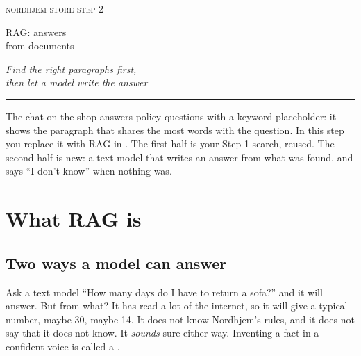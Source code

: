 \documentclass[11pt]{article}
\begin{document}
\thispagestyle{empty}
\setlength{\parindent}{0pt}
\vspace*{1.2cm}
{\color{muted}\scshape\MakeLowercase{Nordhjem store}
  \textperiodcentered{} \MakeLowercase{Step 2}}\par
\vspace{0.9cm}
{\fontsize{28}{32}\selectfont RAG: answers\\[2pt] from documents\par}
\vspace{0.5cm}
{\large\itshape\color{muted} Find the right paragraphs first,\\
  then let a model write the answer\par}
\vspace{0.6cm}
{\color{accent}\rule{2.2cm}{1.2pt}}\par
\vspace{0.6cm}
\begin{minipage}{11.5cm}
\small\color{muted}
The chat on the shop answers policy questions with a keyword
placeholder: it shows the paragraph that shares the most words with the
question. In this step you replace it with RAG in .
The first half is your Step 1 search, reused. The second half is new:
a text model that writes an answer from what was found, and says ``I
don't know'' when nothing was.
\end{minipage}
\vspace{1.0cm}

{\small
\renewcommand{\contentsname}{\normalsize\scshape\color{muted}
  \MakeLowercase{Contents}}
\tableofcontents}

\newpage
\setlength{\parindent}{1.2em}

\section{What RAG is}

\subsection{Two ways a model can answer}

Ask a text model ``How many days do I have to return a sofa?'' and it
will answer. But from what? It has read a lot of the internet, so it
will give a typical number, maybe 30, maybe 14. It does not know
Nordhjem's rules, and it does not say that it does not know. It
\emph{sounds} sure either way. Inventing a fact in a confident voice is
called a .
\end{document}
